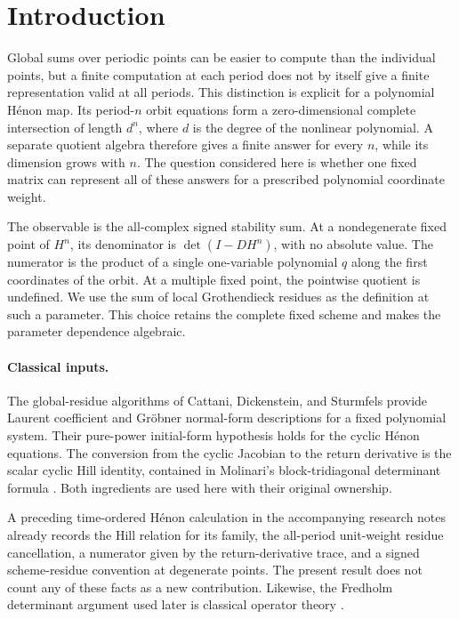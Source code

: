 \section{Introduction}

Global sums over periodic points can be easier to compute than the
individual points, but a finite computation at each period does not by
itself give a finite representation valid at all periods. This distinction
is explicit for a polynomial H\'enon map. Its period-$n$ orbit equations
form a zero-dimensional complete intersection of length $d^n$, where $d$
is the degree of the nonlinear polynomial. A separate quotient algebra
therefore gives a finite answer for every $n$, while its dimension grows
with $n$. The question considered here is whether one fixed matrix can
represent all of these answers for a prescribed polynomial coordinate
weight.

The observable is the all-complex signed stability sum. At a nondegenerate
fixed point of $H^n$, its denominator is $\det(I-DH^n)$, with no absolute
value. The numerator is the product of a single one-variable polynomial
$q$ along the first coordinates of the orbit. At a multiple fixed point,
the pointwise quotient is undefined. We use the sum of local
Grothendieck residues as the definition at such a parameter. This choice
retains the complete fixed scheme and makes the parameter dependence
algebraic.

\paragraph{Classical inputs.}
The global-residue algorithms of
Cattani, Dickenstein, and Sturmfels
\citep[Theorem~2.3 and Lemma~4.2 of the author preprint]{cattani1996residues}
provide Laurent coefficient and Gr\"obner normal-form descriptions for a
fixed polynomial system. Their pure-power initial-form hypothesis holds
for the cyclic H\'enon equations. The conversion from the cyclic Jacobian
to the return derivative is the scalar cyclic Hill identity, contained
in Molinari's block-tridiagonal determinant formula
\citep[Eq.~(1) of the author preprint v3]{molinari2008determinants}.
Both ingredients are used here with their original ownership.

A preceding time-ordered H\'enon calculation in the accompanying research
notes \citep[Lemma~4 and Theorem~5]{timeordered2026notes} already records
the Hill relation for its family, the all-period unit-weight residue
cancellation, a numerator given by the return-derivative trace, and a
signed scheme-residue convention at degenerate points. The present result
does not count any of these facts as a new contribution. Likewise, the
Fredholm determinant argument used later is classical operator theory
\citep[Sec.~3 of the author manuscript]{bornemann2010fredholm}.

